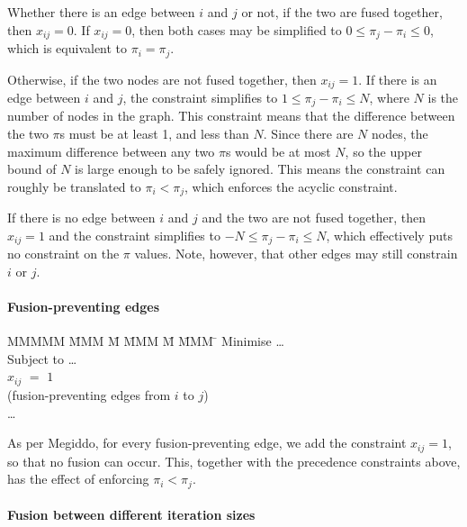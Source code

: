 Whether there is an edge between $i$ and $j$ or not, if the two are fused together, then $x_{ij} = 0$. If $x_{ij} = 0$, then both cases may be simplified to $0 \le \pi_j - \pi_i \le 0$, which is equivalent to $\pi_i = \pi_j$. 

Otherwise, if the two nodes are not fused together, then $x_{ij} = 1$. If there is an edge between $i$ and $j$, the constraint simplifies to $1 \le \pi_j - \pi_i \le N$, where $N$ is the number of nodes in the graph. This constraint means that the difference between the two $\pi$s must be at least 1, and less than $N$. Since there are $N$ nodes, the maximum difference between any two $\pi$s would be at most $N$, so the upper bound of $N$ is large enough to be safely ignored. This means the constraint can roughly be translated to $\pi_i < \pi_j$, which enforces the acyclic constraint.

If there is no edge between $i$ and $j$ and the two are not fused together, then $x_{ij} = 1$ and the constraint simplifies to $-N \le \pi_j - \pi_i \le N$, which effectively puts no constraint on the $\pi$ values.
Note, however, that other edges may still constrain $i$ or $j$.


\paragraph{Fusion-preventing edges}
\begin{tabbing}
MMMMM   \= MMM \= M \= MMM \= M \= MMM \= \kill
Minimise   \> \ldots \\
Subject to \> \ldots \\
           \> $x_{ij}$    \> $=$   \> $1$             \>       \>            \\
           \> (fusion-preventing edges from $i$ to $j$)      \\
           \> \ldots
\end{tabbing}
As per Megiddo\cite{megiddo1998optimal}, for every fusion-preventing edge, we add the constraint $x_{ij} = 1$, so that no fusion can occur. This, together with the precedence constraints above, has the effect of enforcing $\pi_i < \pi_j$.


\paragraph{Fusion between different iteration sizes}

